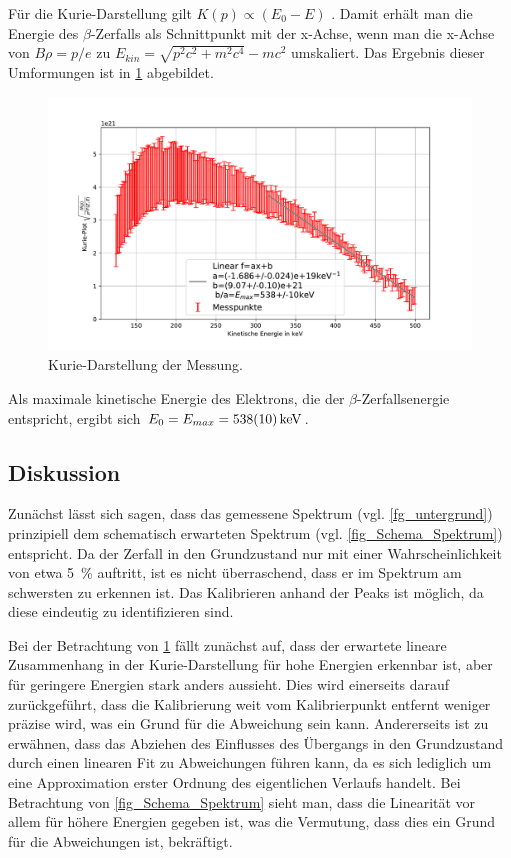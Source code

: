 \documentclass[
	a4paper,
	12pt,
	pagesize,
	ngerman
]{scrartcl}
\begin{document}
	Für die Kurie-Darstellung gilt $K(p)\propto (E_0-E)$ \cite{Anleitung}.
	Damit erhält man die Energie des $\beta$-Zerfalls als Schnittpunkt mit der x-Achse, wenn man die x-Achse von $B\rho=p/e$ zu $E_{kin}=\sqrt{p^2c^2+m^2c^4}-mc^2$ umskaliert.
	Das Ergebnis dieser Umformungen ist in \cref{fg_kurie} abgebildet.
	\begin{figure}[H]
			\includegraphics[width=  \linewidth]{img/kurie}
			\caption{
			Kurie-Darstellung der Messung.
			}
			\label{fg_kurie}
	\end{figure}
	Als maximale kinetische Energie des Elektrons, die der $\beta$-Zerfallsenergie entspricht, ergibt sich $E_0=E_{max}=\SI{538+-10}{keV}$.
	\subsection{Diskussion}
	Zunächst lässt sich sagen, dass das gemessene Spektrum (vgl. \cref{fg_untergrund}) prinzipiell dem schematisch erwarteten Spektrum (vgl. \cref{fig_Schema_Spektrum}) entspricht.
	Da der Zerfall in den Grundzustand nur mit einer Wahrscheinlichkeit von etwa \SI{5}{\percent} auftritt, ist es nicht überraschend, dass er im Spektrum am schwersten zu erkennen ist.
	Das Kalibrieren anhand der Peaks ist möglich, da diese eindeutig zu identifizieren sind.

	Bei der Betrachtung von \cref{fg_kurie} fällt zunächst auf, dass der erwartete lineare Zusammenhang in der Kurie-Darstellung für hohe Energien erkennbar ist, aber für geringere Energien stark anders aussieht.
	Dies wird einerseits darauf zurückgeführt, dass die Kalibrierung weit vom Kalibrierpunkt entfernt weniger präzise wird, was ein Grund für die Abweichung sein kann.
	Andererseits ist zu erwähnen, dass das Abziehen des Einflusses des Übergangs in den Grundzustand durch einen linearen Fit zu Abweichungen führen kann, da es sich lediglich um eine Approximation erster Ordnung des eigentlichen Verlaufs handelt.
	Bei Betrachtung von \cref{fig_Schema_Spektrum} sieht man, dass die Linearität vor allem für höhere Energien gegeben ist, was die Vermutung, dass dies ein Grund für die Abweichungen ist, bekräftigt.
\end{document}
